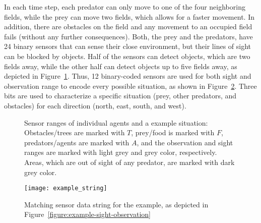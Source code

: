 In each time step, each predator can only move to one of the four neighboring fields, while the prey can move two fields, which allows for a faster movement. In addition, there are obstacles on the field and any movement to an occupied field fails (without any further consequences). Both, the prey and the predators, have 24 binary sensors that can sense their close environment, but their lines of sight can be blocked by objects. Half of the sensors can detect objects, which are two fields away, while the other half can detect objects up to five fields away, as depicted in Figure~\ref{figure:sight-directions}. %
Thus, 12 binary-coded sensors are used for both sight and observation range to encode every possible situation, as shown in Figure~\ref{figure:example-string}. Three bits are used to characterize a specific situation (prey, other predators, and obstacles) for each direction (north, east, south, and west). 

\begin{figure}[ht]
	\hfill
  \hfill
  \subfigure[Example situation]{ %
  	\label{figure:example-sight-observation}
  	\texttt{[image: example\_sight\_observation]}}
  \caption{Sensor ranges of individual agents and a example situation: Obstacles/trees are marked with $T$, prey/food is marked with $F$, predators/agents are marked with $A$, and the observation and sight ranges are marked with light grey and grey color, respectively. Areas, which are out of sight of any predator, are marked with dark grey color.}
  \label{figure:sight-directions}
\end{figure}

\begin{figure}[ht]
	\centerline{
		\texttt{[image: example\_string]}
	}
	\caption{Matching sensor data string for the example, as depicted in Figure~\ref{figure:example-sight-observation}}
	\label{figure:example-string}
\end{figure}


